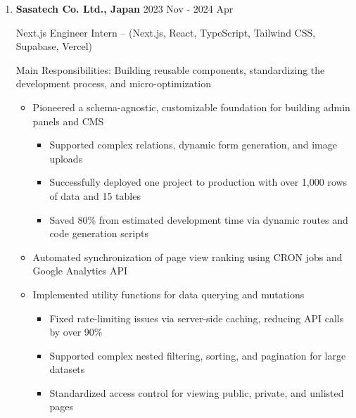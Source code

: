 \documentclass[
  a4paper,
  10pt,
  dvipdfmx
]{article}
\begin{document}
\begin{enumerate}[]
  \item \textbf{Sasatech Co. Ltd., Japan} \hfill 2023 Nov - 2024 Apr


        Next.js Engineer Intern -- (Next.js, React, TypeScript, Tailwind CSS, Supabase, Vercel)

        Main Responsibilities: Building reusable components, standardizing the development process, and micro-optimization
        \begin{itemize}
          \item Pioneered a schema-agnostic, customizable foundation for building admin panels and CMS
                \begin{itemize}
                  \item Supported complex relations, dynamic form generation, and image uploads
                  \item Successfully deployed one project to production with over 1,000 rows of data and 15 tables
                  \item Saved 80\% from estimated development time via dynamic routes and code generation scripts
                \end{itemize}
          \item Automated synchronization of page view ranking using CRON jobs and Google Analytics API
          \item Implemented utility functions for data querying and mutations
                \begin{itemize}
                  \item Fixed rate-limiting issues via server-side caching, reducing API calls by over 90\%
                  \item Supported complex nested filtering, sorting, and pagination for large datasets
                  \item Standardized access control for viewing public, private, and unlisted pages
                \end{itemize}
        \end{itemize}
\end{enumerate}

\end{document}
